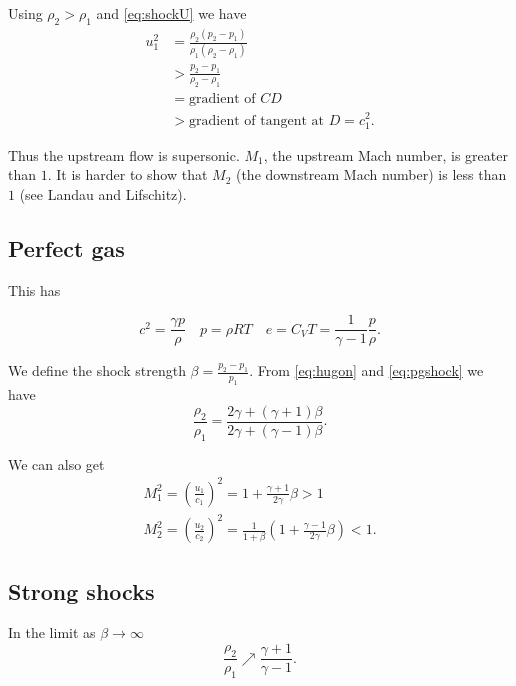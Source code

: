 \documentclass{notes}
\begin{document}
Using $\rho_2 > \rho_1$ and \eqref{eq:shockU} we have
\begin{align*}
u_1^2 & = \frac{\rho_2 (p_2 - p_1)}{\rho_1 (\rho_2 - \rho_1)} \\
& > \frac{p_2 - p_1}{\rho_2 - \rho_1} \\
& = \text{gradient of $CD$} \\
& > \text{gradient of tangent at $D$} = c_1^2.
\end{align*}

Thus the upstream flow is supersonic.  $M_1$, the upstream Mach number,
is greater than $1$.  It is harder to show that $M_2$ (the downstream
Mach number) is less than $1$ (see Landau and Lifschitz).

\subsection{Perfect gas}

This has

\begin{equation}\label{eq:pgshock}
c^2 = \frac{\gamma p}{\rho} \quad
p = \rho R T \quad e = C_V T = \frac{1}{\gamma - 1} \frac{p}{\rho}.
\end{equation}

We define the shock strength $\beta = \frac{p_2 - p_1}{p_1}$.  From
\eqref{eq:hugon} and \eqref{eq:pgshock} we have
\begin{equation}\label{eq:pgshock2}
\frac{\rho_2}{\rho_1} = \frac{2 \gamma + (\gamma + 1) \beta}{
2 \gamma + (\gamma - 1) \beta}.
\end{equation}

We can also get
\begin{equation}\label{eq:shockmach}
\begin{gathered}
  M_1^2 = \left(\frac{u_1}{c_1}\right)^2 = 1 + \frac{\gamma +1 }{2
    \gamma} \beta > 1 \\
  M_2^2 = \left(\frac{u_2}{c_2}\right)^2 = \frac{1}{1 + \beta} \left(
    1 + \frac{\gamma -1}{2 \gamma} \beta \right) < 1.
\end{gathered}
\end{equation}

\subsection{Strong shocks}

In the limit as $\beta \to \infty$
\[
\frac{\rho_2}{\rho_1} \nearrow \frac{\gamma + 1}{\gamma - 1}.
\]
\end{document}
